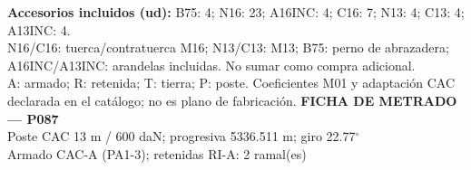 \begingroup\scriptsize
\textbf{Accesorios incluidos (ud):} B75: 4; N16: 23; A16INC: 4; C16: 7; N13: 4; C13: 4; A13INC: 4.\\
N16/C16: tuerca/contratuerca M16; N13/C13: M13; B75: perno de abrazadera; A16INC/A13INC: arandelas incluidas. No sumar como compra adicional.\\
A: armado; R: retenida; T: tierra; P: poste. Coeficientes M01 y adaptación CAC declarada en el catálogo; no es plano de fabricación.
\endgroup\endgroup
\clearpage{}
\begingroup\small\setlength{\parskip}{3pt}\renewcommand{\arraystretch}{1.05}
\textbf{\large FICHA DE METRADO — P087}\\[4pt]
Poste CAC 13 m / 600 daN; progresiva 5336.511 m; giro 22.77\ensuremath{^\circ}\\
Armado CAC-A (PA1-3); retenidas RI-A: 2 ramal(es)\\
\begingroup\scriptsize
